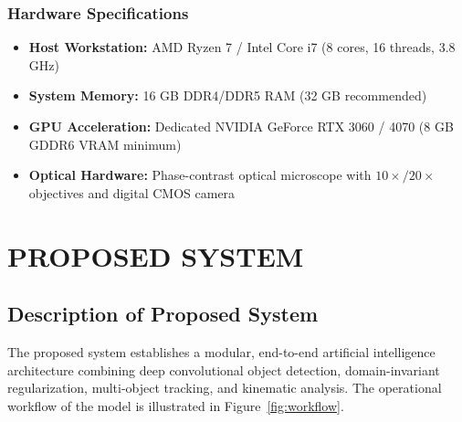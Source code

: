 \documentclass[12pt,a4paper]{report}
\begin{document}
\subsection{Hardware Specifications}
\begin{itemize}
    \item \textbf{Host Workstation:} AMD Ryzen 7 / Intel Core i7 (8 cores, 16 threads, 3.8 GHz)
    \item \textbf{System Memory:} 16 GB DDR4/DDR5 RAM (32 GB recommended)
    \item \textbf{GPU Acceleration:} Dedicated NVIDIA GeForce RTX 3060 / 4070 (8 GB GDDR6 VRAM minimum)
    \item \textbf{Optical Hardware:} Phase-contrast optical microscope with $10\times/20\times$ objectives and digital CMOS camera
\end{itemize}

\chapter{PROPOSED SYSTEM}

\section{Description of Proposed System}
The proposed system establishes a modular, end-to-end artificial intelligence architecture combining deep convolutional object detection, domain-invariant regularization, multi-object tracking, and kinematic analysis. The operational workflow of the model is illustrated in Figure~\ref{fig:workflow}.
\end{document}
